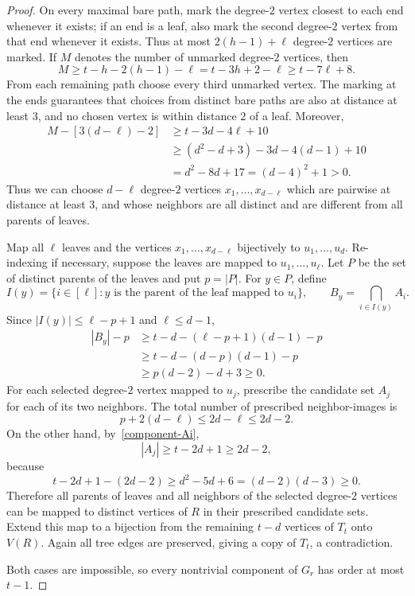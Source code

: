 \documentclass[11pt,a4paper]{article}
\begin{document}
\begin{proof}
On every maximal bare path, mark the degree-$2$ vertex closest to each end whenever it exists; if an end is a leaf, also mark the second degree-$2$ vertex from that end whenever it exists. Thus at most $2(h-1)+\ell$ degree-$2$ vertices are marked. If $M$ denotes the number of unmarked degree-$2$ vertices, then
\[
M\ge t-h-2(h-1)-\ell=t-3h+2-\ell\ge t-7\ell+8.
\]
From each remaining path choose every third unmarked vertex. The marking at the ends guarantees that choices from distinct bare paths are also at distance at least $3$, and no chosen vertex is within distance $2$ of a leaf. Moreover,
\[
\begin{aligned}
M-[3(d-\ell)-2]
&\ge t-3d-4\ell+10\\
&\ge(d^2-d+3)-3d-4(d-1)+10\\
&=d^2-8d+17=(d-4)^2+1>0.
\end{aligned}
\]
Thus we can choose $d-\ell$ degree-$2$ vertices $x_1,\ldots,x_{d-\ell}$ which are pairwise at distance at least $3$, and whose neighbors are all distinct and are different from all parents of leaves.

Map all $\ell$ leaves and the vertices $x_1,\ldots,x_{d-\ell}$ bijectively to $u_1,\ldots,u_d$. Re-indexing if necessary, suppose the leaves are mapped to $u_1,\ldots,u_\ell$. Let $P$ be the set of distinct parents of the leaves and put $p=|P|$. For $y\in P$, define
\[
I(y)=\{i\in[\ell]:y\text{ is the parent of the leaf mapped to }u_i\},
\qquad B_y=\bigcap_{i\in I(y)}A_i.
\]
Since $|I(y)|\le\ell-p+1$ and $\ell\le d-1$,
\[
\begin{aligned}
|B_y|-p
&\ge t-d-(\ell-p+1)(d-1)-p\\
&\ge t-d-(d-p)(d-1)-p\\
&\ge p(d-2)-d+3\ge0.
\end{aligned}
\]
For each selected degree-$2$ vertex mapped to $u_j$, prescribe the candidate set $A_j$ for each of its two neighbors. The total number of prescribed neighbor-images is
\[
p+2(d-\ell)\le2d-\ell\le2d-2.
\]
On the other hand, by~\eqref{component-Ai},
\[
|A_j|\ge t-2d+1\ge2d-2,
\]
because
\[
t-2d+1-(2d-2)\ge d^2-5d+6=(d-2)(d-3)\ge0.
\]
Therefore all parents of leaves and all neighbors of the selected degree-$2$ vertices can be mapped to distinct vertices of $R$ in their prescribed candidate sets. Extend this map to a bijection from the remaining $t-d$ vertices of $T_t$ onto $V(R)$. Again all tree edges are preserved, giving a copy of $T_t$, a contradiction.

Both cases are impossible, so every nontrivial component of $G_r$ has order at most $t-1$.
\end{proof}
\end{document}
